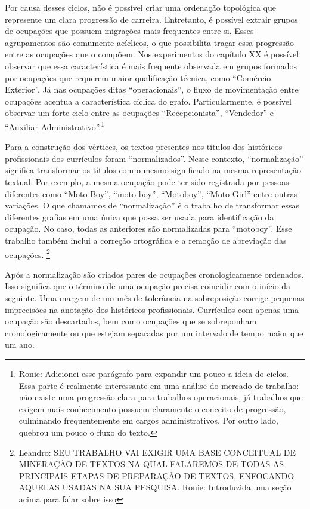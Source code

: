 \documentclass[12pt,a4paper]{article}
\begin{document}
Por causa desses ciclos, não é possível criar uma ordenação topológica que represente um clara progressão de carreira. Entretanto, é possível extrair grupos de ocupações que possuem migrações mais frequentes entre si. Esses agrupamentos são comumente acíclicos, o que possibilita traçar essa progressão entre as ocupações que o compõem. Nos experimentos do capítulo XX é possível observar que essa característica é mais frequente observada em grupos formados por ocupações que requerem maior qualificação técnica, como \enquote{Comércio Exterior}. Já nas ocupações ditas \enquote{operacionais}, o fluxo de movimentação entre ocupações acentua a característica cíclica do grafo. Particularmente, é possível observar um forte ciclo entre as ocupações \enquote{Recepcionista}, \enquote{Vendedor} e \enquote{Auxiliar Administrativo}.\footnote{Ronie: Adicionei esse parágrafo para expandir um pouco a ideia do ciclos. Essa parte é realmente interessante em uma análise do mercado de trabalho: não existe uma progressão clara para trabalhos operacionais, já trabalhos que exigem mais conhecimento possuem claramente o conceito de progressão, culminando frequentemente em cargos administrativos. Por outro lado, quebrou um pouco o fluxo do texto.}

Para a construção dos vértices, os textos presentes nos títulos dos históricos profissionais dos currículos foram \enquote{normalizados}. Nesse contexto, \enquote{normalização} significa transformar os títulos com o mesmo significado na mesma representação textual. Por exemplo, a mesma ocupação pode ter sido registrada por pessoas diferentes como \enquote{Moto Boy}, \enquote{moto boy}, \enquote{Motoboy}, \enquote{Moto Girl} entre outras variações. O que chamamos de \enquote{normalização} é o trabalho de transformar essas diferentes grafias em uma única que possa ser usada para identificação da ocupação. No caso, todas as anteriores são normalizadas para \enquote{motoboy}. Esse trabalho também inclui a correção ortográfica e a remoção de abreviação das ocupações. \footnote{Leandro: SEU TRABALHO VAI EXIGIR UMA BASE CONCEITUAL DE MINERAÇÃO DE TEXTOS NA QUAL FALAREMOS DE TODAS AS PRINCIPAIS ETAPAS DE PREPARAÇÃO DE TEXTOS, ENFOCANDO AQUELAS USADAS NA SUA PESQUISA. Ronie: Introduzida uma seção acima para falar sobre isso}

Após a normalização são criados pares de ocupações cronologicamente ordenados. Isso significa que o término de uma ocupação precisa coincidir com o início da seguinte. Uma margem de um mês de tolerância na sobreposição corrige pequenas imprecisões na anotação dos históricos profissionais. Currículos com apenas uma ocupação são descartados, bem como ocupações que se sobreponham cronologicamente ou que estejam separadas por um intervalo de tempo maior que um ano.
\end{document}
